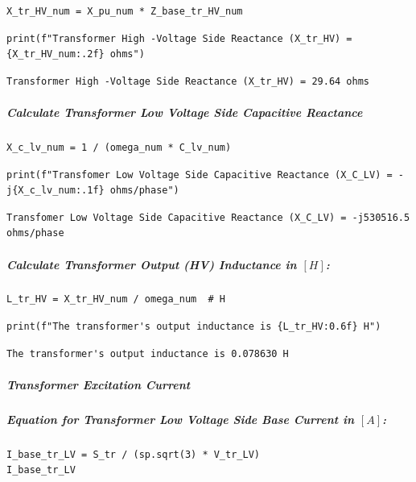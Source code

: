 \begin{verbatim}
X_tr_HV_num = X_pu_num * Z_base_tr_HV_num
\end{verbatim}

\begin{verbatim}
print(f"Transformer High -Voltage Side Reactance (X_tr_HV) = {X_tr_HV_num:.2f} ohms")
\end{verbatim}

\begin{verbatim}
Transformer High -Voltage Side Reactance (X_tr_HV) = 29.64 ohms
\end{verbatim}

\subparagraph{Calculate Transformer Low Voltage Side Capacitive Reactance}

\begin{verbatim}
X_c_lv_num = 1 / (omega_num * C_lv_num)
\end{verbatim}

\begin{verbatim}
print(f"Transfomer Low Voltage Side Capacitive Reactance (X_C_LV) = -j{X_c_lv_num:.1f} ohms/phase")
\end{verbatim}

\begin{verbatim}
Transfomer Low Voltage Side Capacitive Reactance (X_C_LV) = -j530516.5 ohms/phase
\end{verbatim}

\subparagraph{Calculate Transformer Output (HV) Inductance in $\left[H\right]$:}

\begin{verbatim}
L_tr_HV = X_tr_HV_num / omega_num  # H
\end{verbatim}

\begin{verbatim}
print(f"The transformer's output inductance is {L_tr_HV:0.6f} H")
\end{verbatim}

\begin{verbatim}
The transformer's output inductance is 0.078630 H
\end{verbatim}

\subparagraph{Transformer Excitation Current}

\subparagraph{Equation for Transformer Low Voltage Side Base Current in $\left[A\right]$:}

\begin{verbatim}
I_base_tr_LV = S_tr / (sp.sqrt(3) * V_tr_LV)
I_base_tr_LV
\end{verbatim}

